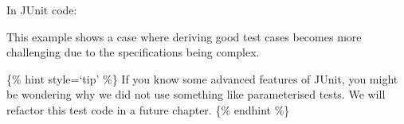In JUnit code:

\begin{Shaded}
\begin{Highlighting}[]
 
      \NormalTok{();}

     \NormalTok{() \{}
        \NormalTok{({-}}\NormalTok{(}\NormalTok{, }\NormalTok{, }\NormalTok{));}
\NormalTok{    \}}

     \NormalTok{() \{}
        \NormalTok{(}\NormalTok{(}\NormalTok{, }\NormalTok{, }\NormalTok{));}
\NormalTok{    \}}

     \NormalTok{() \{}
        \NormalTok{(}\NormalTok{(}\NormalTok{, }\NormalTok{, }\NormalTok{));}
\NormalTok{    \}}

     \NormalTok{() \{}
        \NormalTok{(}\NormalTok{(}\NormalTok{, }\NormalTok{, }\NormalTok{));}
\NormalTok{    \}}

     \NormalTok{() \{}
      \NormalTok{({-}}\NormalTok{({-}}\NormalTok{, {-}}\NormalTok{, {-}}\NormalTok{));}
\NormalTok{    \}}
\NormalTok{\}}
\end{Highlighting}
\end{Shaded}

This example shows a case where deriving good test cases becomes more
challenging due to the specifications being complex.

\{\% hint style=`tip' \%\} If you know some advanced features of JUnit,
you might be wondering why we did not use something like parameterised
tests. We will refactor this test code in a future chapter. \{\% endhint
\%\}

